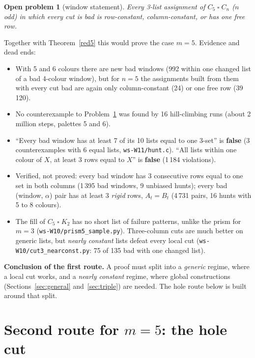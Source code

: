 \documentclass[11pt]{article}
\theoremstyle{plain}
\newtheorem{openprob}[theorem]{Open problem}
\theoremstyle{definition}
\theoremstyle{remark}
\newcommand{\T}{\mathbin{\square}}
\newcommand{\script}[1]{\texttt{#1}}
\begin{document}
\begin{openprob}[window statement]\label{window}
Every 3-list assignment of $C_5 \T C_n$ ($n$ odd) in which every cut is bad is row-constant, column-constant, or has one free
row.
\end{openprob}

Together with Theorem~\ref{red5} this would prove the case $m = 5$. Evidence and dead ends:
\begin{itemize}[itemsep=0.2em]
\item With 5 and 6 colours there are new bad windows (992 within one changed list of a bad 4-colour window), but for
$n = 5$ the assignments built from them with every cut bad are again only column-constant (24) or one free row (39\,120).
\item No counterexample to Problem~\ref{window} was found by 16 hill-climbing runs (about 2 million steps, palettes 5 and 6).
\item ``Every bad window has at least 7 of its 10 lists equal to one 3-set'' is \textbf{false} (3 counterexamples with 6
equal lists, \script{ws-W11/hunt.c}). ``All lists within one colour of $X$, at least 3 rows equal to $X$'' is
\textbf{false} (1\,184 violations).
\item Verified, not proved: every bad window has 3 consecutive rows equal to one set in both columns (1\,395 bad windows, 9
unbiased hunts); every bad (window, $\alpha$) pair has at least 3 \emph{rigid} rows, $A_t = B_t$ (4\,731 pairs, 16 hunts
with 5 to 8 colours).
\item The fill of $C_5 \T K_2$ has no short list of failure patterns, unlike the prism for $m = 3$ (\script{ws-W10/prism5\_sample.py}).
Three-column cuts are much better on generic lists, but \emph{nearly constant} lists defeat every local cut
(\script{ws-W10/cut3\_nearconst.py}: 75 of 135 bad with one changed list).
\end{itemize}

\textbf{Conclusion of the first route.} A proof must split into a \emph{generic} regime, where a local cut works, and a
\emph{nearly constant} regime, where global constructions (Sections~\ref{sec:general} and~\ref{sec:triple}) are needed.
The hole route below is built around that split.

\section{Second route for $m = 5$: the hole cut}\label{sec:hole}
\end{document}
